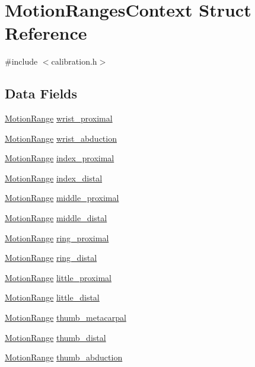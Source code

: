 \hypertarget{struct_motion_ranges_context}{}\section{Motion\+Ranges\+Context Struct Reference}
\label{struct_motion_ranges_context}


{\ttfamily \#include $<$calibration.\+h$>$}

\subsection*{Data Fields}
\begin{DoxyCompactItemize}
\item 
\hyperlink{struct_motion_range}{Motion\+Range} \hyperlink{struct_motion_ranges_context_a556762ae0bb1f0c5a24b9fdd89e1ea11}{wrist\+\_\+proximal}
\item 
\hyperlink{struct_motion_range}{Motion\+Range} \hyperlink{struct_motion_ranges_context_a46bf6c9b0072993ab610743222a73f85}{wrist\+\_\+abduction}
\item 
\hyperlink{struct_motion_range}{Motion\+Range} \hyperlink{struct_motion_ranges_context_a1fbc3b009c5b65b5a276d9130430e07c}{index\+\_\+proximal}
\item 
\hyperlink{struct_motion_range}{Motion\+Range} \hyperlink{struct_motion_ranges_context_a0068911ddf021eba850e650658768f3f}{index\+\_\+distal}
\item 
\hyperlink{struct_motion_range}{Motion\+Range} \hyperlink{struct_motion_ranges_context_acbb90d899cdd2d9763908721974530e2}{middle\+\_\+proximal}
\item 
\hyperlink{struct_motion_range}{Motion\+Range} \hyperlink{struct_motion_ranges_context_aef2100be6e43685007ba248fa5ae23fd}{middle\+\_\+distal}
\item 
\hyperlink{struct_motion_range}{Motion\+Range} \hyperlink{struct_motion_ranges_context_a728150b042ddbd2b14a77da912904019}{ring\+\_\+proximal}
\item 
\hyperlink{struct_motion_range}{Motion\+Range} \hyperlink{struct_motion_ranges_context_a4bf9f54ed83b6ce5fa7d770968600396}{ring\+\_\+distal}
\item 
\hyperlink{struct_motion_range}{Motion\+Range} \hyperlink{struct_motion_ranges_context_a01265db429ce10277e19e1839f4971c2}{little\+\_\+proximal}
\item 
\hyperlink{struct_motion_range}{Motion\+Range} \hyperlink{struct_motion_ranges_context_aea066eae83a1bde6c21023849ac01e1b}{little\+\_\+distal}
\item 
\hyperlink{struct_motion_range}{Motion\+Range} \hyperlink{struct_motion_ranges_context_aa46ce0e92b0d5e61049dd86dcabd5b84}{thumb\+\_\+metacarpal}
\item 
\hyperlink{struct_motion_range}{Motion\+Range} \hyperlink{struct_motion_ranges_context_a115d2252ff3fd8531f55da2a0555335f}{thumb\+\_\+distal}
\item 
\hyperlink{struct_motion_range}{Motion\+Range} \hyperlink{struct_motion_ranges_context_a86ec1c2720c4f2d517a96ec24313ef38}{thumb\+\_\+abduction}
\end{DoxyCompactItemize}


